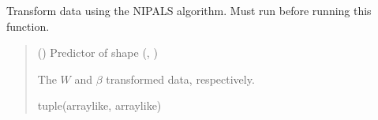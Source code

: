 \documentclass[letterpaper,10pt,english]{sphinxmanual}
\begin{document}
\begin{fulllineitems}
\label{\detokenize{NIPALS:NIPALS.nipals.nipals.transform}}
\pysigstartsignatures
{}
\pysigstopsignatures
\sphinxAtStartPar
Transform data using the NIPALS algorithm. Must run {\hyperref[\detokenize{NIPALS:NIPALS.nipals.nipals.fit}]{}} before running this function.
\begin{quote}\begin{description}
\sphinxAtStartPar
{} () \textendash{} Predictor of shape (, )

\sphinxAtStartPar
The \(W\) and \(\beta\) transformed data, respectively.

\sphinxAtStartPar
tuple(array\sphinxhyphen{}like, array\sphinxhyphen{}like)

\end{description}\end{quote}

\end{fulllineitems}




\renewcommand{\indexname}{Index}
\printindex
\end{document}
